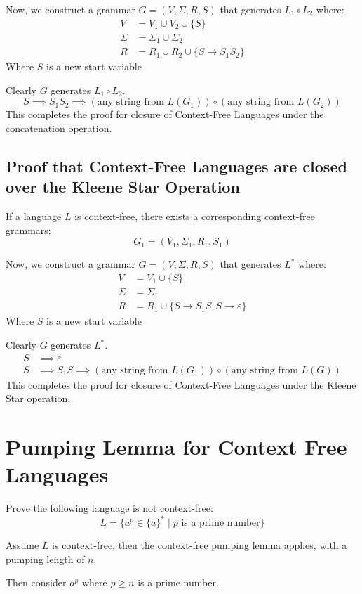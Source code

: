 \documentclass[11pt]{article}
\begin{document}
Now, we construct a grammar $G=(V,\Sigma,R,S)$ that generates $L_1 \circ L_2$
where:
\begin{align*}
V &= V_1 \cup V_2 \cup \{S\} \\
\Sigma &= \Sigma_1 \cup \Sigma_2 \\
R &= R_1 \cup R_2 \cup \{S \to S_1S_2 \}
\end{align*}
Where $S$ is a new start variable

Clearly $G$ generates $L_1 \circ L_2$.
$$S \implies S_1S_2 \implies (\text{any string from }L(G_1)) \circ (\text{any
string from }L(G_2))$$
This completes the proof for closure of Context-Free Languages under the
concatenation operation.

\newpage
\subsection{Proof that Context-Free Languages are closed over the Kleene Star
Operation}
If a language $L$ is context-free, there exists a corresponding	
context-free grammars:
$$G_1 = (V_1,\Sigma_1, R_1,S_1)$$

Now, we construct a grammar $G=(V,\Sigma,R,S)$ that generates $L^\ast$
where:
\begin{align*}
V &= V_1 \cup \{S\} \\
\Sigma &= \Sigma_1 \\
R &= R_1 \cup \{S \to S_1S, S \to \varepsilon \}
\end{align*}
Where $S$ is a new start variable

Clearly $G$ generates $L^\ast$.
\begin{align*}
S & \implies \varepsilon \\
S & \implies S_1S \implies (\text{any string from }L(G_1))	\circ (\text{any
string from }L(G))
\end{align*}
This completes the proof for closure of Context-Free Languages under the
Kleene Star operation.

\newpage
\section{Pumping Lemma for Context Free Languages}
Prove the following language is not context-free:
$$L=\{a^p \in \{a\}^\ast \mid p \text{ is a prime number}\}$$

Assume $L$ is context-free, then the context-free pumping lemma applies, with a
pumping length of $n$.

Then consider $a^p$ where $p \geq n$ is a prime number.
\end{document}
